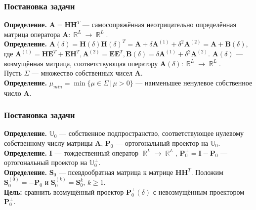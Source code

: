 \documentclass[pdf, notheorems, hyperref={bookmarks=false}, handout]{beamer}
\DeclareMathOperator{\R}{\mathbb{R}}
\begin{document}
	\begin{frame}\frametitle{Постановка задачи}		
	{\bf Определение.} $\textbf{A}=\textbf{H}\textbf{H}^T$ --- самосопряжённая неотрицательно определённая матрица оператора $\textbf{A}:\R^L\rightarrow\R^L$.\pause\\
	{\bf Определение. }$\textbf{A}(\delta)=\textbf{H}(\delta)\textbf{H}(\delta)^T = \textbf{A} + \delta\textbf{A}^{(1)}+\delta^2\textbf{A}^{(2)}= \textbf{A} + \textbf{B}(\delta)$, где $\textbf{A}^{(1)} = \textbf{H}\textbf{E}^T + \textbf{E}\textbf{H}^T, \textbf{A}^{(2)}=\textbf{E}\textbf{E}^T, \textbf{B}(\delta)=\delta\textbf{A}^{(1)}+\delta^2\textbf{A}^{(2)}$. $\textbf{A}(\delta)$ --- возмущённая матрица, соответствующая оператору $\textbf{A}(\delta):\R^L\rightarrow\R^L$.\pause\\
	Пусть $\Sigma$ --- множество собственных чисел $\textbf{A}$.\\
	{\bf Определение. }$\mu_{min} = \min\{\mu\in\Sigma\,|\,\mu > 0\}$ --- наименьшее ненулевое собственное число $\textbf{A}$. 
	\end{frame}
	\begin{frame}\frametitle{Постановка задачи}
		{\bf Определение.} $\mathbb{U}_0$ --- собственное подпространство, соответствующее нулевому собственному числу матрицы $\textbf{A}$, $\textbf{P}_0$ --- ортогональный проектор на $\mathbb{U}_0$.\pause\\
		{\bf Определение.} $\textbf{I}$ --- тождественный оператор $\R^L\rightarrow\R^L$, $\textbf{P}_0^\bot = \textbf{I} - \textbf{P}_0$ --- ортогональный проектор на $\mathbb{U}_0^\bot$.\pause\\
		{\bf Определение. }$\textbf{S}_0$ --- псевдообратная матрица к матрице $\textbf{H}\textbf{H}^T$. Положим $\textbf{S}_0^{(0)}=-\textbf{P}_0$ и $\textbf{S}_0^{(k)}=\textbf{S}_0^k,\,k\geqslant 1$.\pause\vspace{\baselineskip}\\
		{\bf Цель:} сравнить возмущённый проектор $\textbf{P}_0^\bot(\delta)$ с невозмущённым проектором $\textbf{P}_0^\bot$.
	\end{frame}
\end{document}
